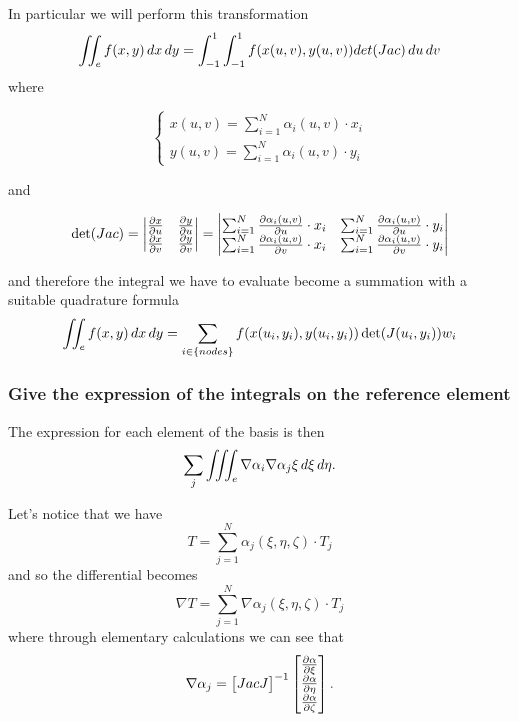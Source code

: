 In particular we will perform this transformation
\[\iint_ef(x,y)\mathop{}\!d x\mathop{}\!d y=\int_{-1}^1\int_{-1}^1f(x(u,v),y(u,v))det(Jac)\mathop{}\!d u\mathop{}\!d v \]
where \\
\begin{minipage}{\linewidth}
	\begin{minipage}{.325\linewidth}
		\[\begin{cases}
		x(u,v)=\sum_{i=1}^{N}\alpha_i(u,v)\cdot x_i\\
		y(u,v)=\sum_{i=1}^{N}\alpha_i(u,v)\cdot y_i
		\end{cases}\]
	\end{minipage}
	and
	\begin{minipage}{.675\linewidth}
		\[
		\det(Jac)=\begin{vmatrix}
		\frac{\partial x}{\partial u}&\frac{\partial y}{\partial u}\\
		\frac{\partial x}{\partial v}&\frac{\partial y}{\partial v}
		\end{vmatrix}
		=
		\begin{vmatrix}
		\sum_{i=1}^{N}\frac{\partial\alpha_i(u,v)}{\partial u}\cdot x_i &\sum_{i=1}^{N}\frac{\partial\alpha_i(u,v)}{\partial u}\cdot y_i\\
		\sum_{i=1}^{N}\frac{\partial\alpha_i(u,v)}{\partial v}\cdot x_i &\sum_{i=1}^{N}\frac{\partial\alpha_i(u,v)}{\partial v}\cdot y_i
		\end{vmatrix}
		\]
	\end{minipage}
\end{minipage}
and therefore the integral we have to evaluate become a summation with a suitable quadrature formula
\[\iint_ef(x,y)\mathop{}\!d x\mathop{}\!d y= \sum_{i\in\{nodes\}}f(x(u_i,y_i),y(u_i,y_i))\det(J(u_i,y_i))w_i \]
\subsubsection{Give the expression of the integrals on the reference element}
The expression for each element of the basis is then
\[\sum_j \iiint_{e}\nabla\alpha_i\nabla\alpha_j\xi\mathop{}\!d\xi\mathop{}\!d\eta. \] 

Let's notice that we have 
\[T=\sum_{j=1}^N\alpha_j(\xi,\eta,\zeta)\cdot T_j \]
and so the differential becomes
\[\nabla T=\sum_{j=1}^N\nabla\alpha_j(\xi,\eta,\zeta)\cdot T_j \]
where through elementary calculations we can see that 
\[\nabla \alpha_j=\begin{bmatrix} Jac J \end{bmatrix}^{-1}\begin{bmatrix}
\frac{\partial \alpha}{\partial \xi}\\\frac{\partial \alpha}{\partial \eta}\\\frac{\partial \alpha}{\partial \zeta} 
\end{bmatrix}. \]

